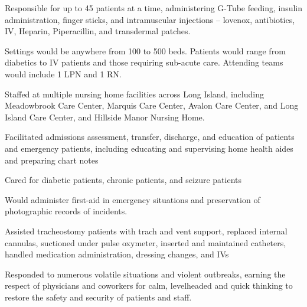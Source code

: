 \documentclass[]{deedy-resume-openfont}
\begin{document}
\begin{minipage}[t]{0.66\textwidth}
\begin{tightemize}
\item Responsible for up to 45 patients at a time, administering G-Tube feeding, insulin administration, finger sticks, and intramuscular injections -- lovenox, antibiotics, IV, Heparin, Piperacillin, and transdermal patches. 

\item Settings would be anywhere from 100 to 500 beds. Patients would range from diabetics to IV patients and those requiring sub-acute care. Attending teams would include 1 LPN and 1 RN.

\item Staffed at multiple nursing home facilities across Long Island, including Meadowbrook Care Center, Marquis Care Center, Avalon Care Center, and Long Island Care Center, and Hillside Manor Nursing Home.

\end{tightemize}
\sectionsep


\begin{tightemize}



\item Facilitated admissions assessment, transfer, discharge, and education of patients and emergency patients, including educating and supervising home health aides and preparing chart notes

\item Cared for diabetic patients, chronic patients, and seizure patients

\item Would administer first-aid in emergency situations and preservation of photographic records of incidents.  

\item Assisted tracheostomy patients with trach and vent support, replaced internal cannulas, suctioned under pulse oxymeter, inserted and maintained catheters, handled medication administration, dressing changes, and IVs

\item Responded to numerous volatile situations and violent outbreaks, earning the respect of physicians and coworkers for calm, levelheaded and quick thinking to restore the safety and security of patients and staff.


\end{tightemize}
\end{minipage}
\end{document}
